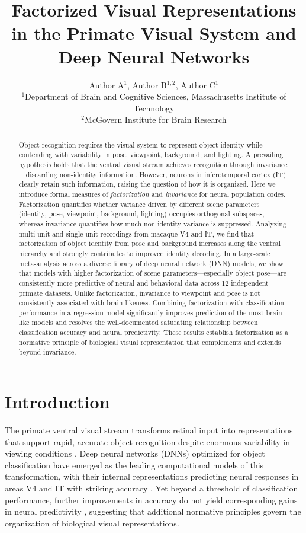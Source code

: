 \documentclass[11pt]{article}
\title{Factorized Visual Representations in the Primate Visual System and Deep Neural Networks}
\author{Author A$^{1}$, Author B$^{1,2}$, Author C$^{1}$ \\
\small $^{1}$Department of Brain and Cognitive Sciences, Massachusetts Institute of Technology \\
\small $^{2}$McGovern Institute for Brain Research}
\date{}
\begin{document}
\maketitle

\begin{abstract}
Object recognition requires the visual system to represent object identity while contending with variability in pose, viewpoint, background, and lighting. A prevailing hypothesis holds that the ventral visual stream achieves recognition through invariance---discarding non-identity information. However, neurons in inferotemporal cortex (IT) clearly retain such information, raising the question of how it is organized. Here we introduce formal measures of \emph{factorization} and \emph{invariance} for neural population codes. Factorization quantifies whether variance driven by different scene parameters (identity, pose, viewpoint, background, lighting) occupies orthogonal subspaces, whereas invariance quantifies how much non-identity variance is suppressed. Analyzing multi-unit and single-unit recordings from macaque V4 and IT, we find that factorization of object identity from pose and background increases along the ventral hierarchy and strongly contributes to improved identity decoding. In a large-scale meta-analysis across a diverse library of deep neural network (DNN) models, we show that models with higher factorization of scene parameters---especially object pose---are consistently more predictive of neural and behavioral data across 12 independent primate datasets. Unlike factorization, invariance to viewpoint and pose is not consistently associated with brain-likeness. Combining factorization with classification performance in a regression model significantly improves prediction of the most brain-like models and resolves the well-documented saturating relationship between classification accuracy and neural predictivity. These results establish factorization as a normative principle of biological visual representation that complements and extends beyond invariance.
\end{abstract}

\section{Introduction}

The primate ventral visual stream transforms retinal input into representations that support rapid, accurate object recognition despite enormous variability in viewing conditions \citep{dicarlo2012}. Deep neural networks (DNNs) optimized for object classification have emerged as the leading computational models of this transformation, with their internal representations predicting neural responses in areas V4 and IT with striking accuracy \citep{yamins2014, cadieu2014}. Yet beyond a threshold of classification performance, further improvements in accuracy do not yield corresponding gains in neural predictivity \citep{schrimpf2018, storrs2021}, suggesting that additional normative principles govern the organization of biological visual representations.
\end{document}

